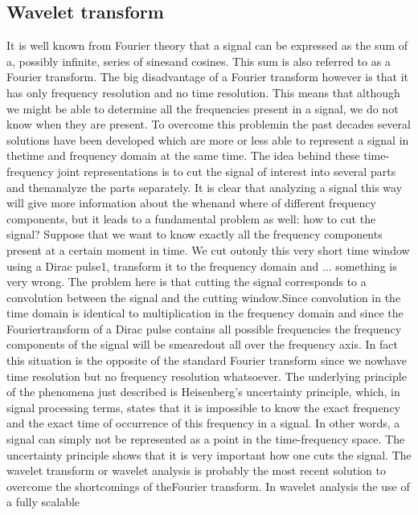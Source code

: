\subsection{Wavelet transform}
\FloatBarrier
It is well known from Fourier theory that a signal can be expressed as the sum of a,
possibly infinite, series of sinesand cosines. 
This sum is also referred to as a Fourier transform. The big disadvantage of a Fourier transform
however is that it has only frequency resolution and no time resolution. 
This means that although we might be able to determine all the frequencies present in a signal, 
we do not know when they are present. 
To overcome this problemin the past decades several solutions have been developed which are more 
or less able to represent a signal in thetime and frequency domain at the same time.
The idea behind these time-frequency joint representations is to cut the signal of interest into
several parts and thenanalyze the parts separately.
It is clear that analyzing a signal this way will give more information about the whenand where of
different frequency components, but it leads to a fundamental problem as well: how to cut the
signal?
Suppose that we want to know exactly all the frequency components present at a certain moment in 
time. We cut outonly this very short time window using a Dirac pulse1, transform it to the
frequency domain and ... something is very wrong.
The problem here is that cutting the signal corresponds to a convolution between the signal and
the cutting window.Since convolution in the time domain is identical to multiplication in the 
frequency domain and since the Fouriertransform of a Dirac pulse contains all possible frequencies
the frequency components of the signal will be smearedout all over the frequency axis.
In fact this situation is the opposite of the standard Fourier transform since we nowhave time
resolution but no frequency resolution whatsoever.
The underlying principle of the phenomena just described is Heisenberg’s uncertainty principle, 
which, in signal processing terms, states that it is impossible to know the exact frequency and
the exact time of occurrence of this frequency in a signal.
In other words, a signal can simply not be represented as a point in the time-frequency space.
The uncertainty principle shows that it is very important how one cuts the signal.
The wavelet transform or wavelet analysis is probably the most recent solution to overcome 
the shortcomings of theFourier transform. In wavelet analysis the use of a fully scalable
